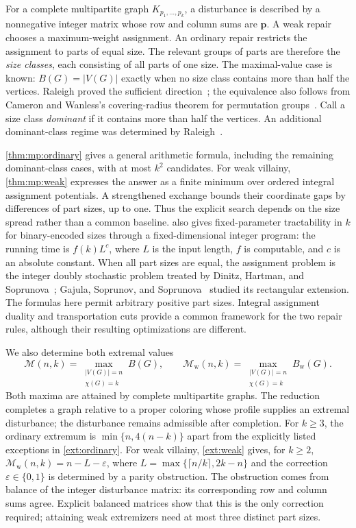 \documentclass[10pt,a4paper]{amsart}
\numberwithin{equation}{section}
\theoremstyle{definition}
\theoremstyle{remark}
\begin{document}
For a complete multipartite graph $K_{p_1,\ldots,p_k}$, a disturbance
is described by a nonnegative integer matrix whose row and column
sums are $\mathbf p$. A weak repair chooses a maximum-weight
assignment. An ordinary repair restricts the assignment to parts of
equal size. The relevant groups of parts are therefore the
\emph{size classes}, each consisting of all parts of one size.
The maximal-value case is known: $B(G)=|V(G)|$ exactly when no size
class contains more than half the vertices. Raleigh proved the
sufficient direction~\cite[Theorem~1]{raleigh2018}; the equivalence
also follows from Cameron and Wanless's covering-radius theorem for
permutation groups~\cite[Theorem~14]{cameronwanless2005}.
Call a size class \emph{dominant} if it contains more than half the
vertices. An additional dominant-class regime was determined by
Raleigh~\cite[Theorem~4]{raleigh2018}.

\cref{thm:mp:ordinary} gives a general arithmetic formula,
including the remaining dominant-class cases, with at most $k^2$
candidates. For weak villainy, \cref{thm:mp:weak} expresses
the answer as a finite minimum over ordered integral assignment
potentials. A strengthened exchange bounds their coordinate gaps
by differences of part sizes, up to one. Thus the explicit search
depends on the size spread rather than a common baseline.
 also gives fixed-parameter tractability
in $k$ for binary-encoded sizes through a fixed-dimensional integer
program: the running time is $f(k)L^c$, where $L$ is the input length,
$f$ is computable, and $c$ is an absolute constant.
When all part sizes are equal, the assignment problem
is the integer doubly stochastic problem treated by Dinitz, Hartman,
and Soprunova~\cite{dinitz2012}; Gajula, Soprunov, and
Soprunova~\cite{gajula2015} studied its rectangular extension.
The formulas here permit arbitrary positive part sizes. Integral
assignment duality and transportation cuts provide a common framework
for the two repair rules, although their resulting optimizations
are different.

We also determine both extremal values
\[
 \mathcal M(n,k)=\max_{\substack{|V(G)|=n\\\chi(G)=k}}B(G),
 \qquad
 \mathcal M_{\mathrm w}(n,k)
 =\max_{\substack{|V(G)|=n\\\chi(G)=k}}B_{\mathrm w}(G).
\]
Both maxima are attained by complete multipartite graphs. The reduction
completes a graph relative to a proper coloring whose profile supplies
an extremal disturbance; the disturbance remains admissible after
completion. For $k\ge3$, the ordinary extremum is
$\min\{n,4(n-k)\}$ apart from the explicitly listed exceptions in
\cref{ext:ordinary}. For weak villainy,
\cref{ext:weak} gives, for $k\ge2$,
$\mathcal M_{\mathrm w}(n,k)=n-L-\varepsilon$, where
$L=\max\{\lceil n/k\rceil,2k-n\}$ and the correction
$\varepsilon\in\{0,1\}$ is determined by a parity obstruction.
The obstruction comes from balance of the integer disturbance matrix:
its corresponding row and column sums agree. Explicit balanced
matrices show that this is the only correction required; attaining
weak extremizers need at most three distinct part sizes.
\end{document}
